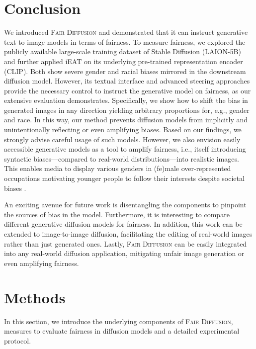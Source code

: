 \documentclass{article}%
\begin{document}
\section*{Conclusion}
We introduced \textsc{Fair Diffusion} and demonstrated that it can instruct generative text-to-image models in terms of fairness. To measure fairness, we explored the publicly available large-scale training dataset of Stable Diffusion (LAION-5B) and further applied iEAT on its underlying pre-trained representation encoder (CLIP). Both show severe gender and racial biases mirrored in the downstream diffusion model. However, its textual interface and advanced steering approaches provide the necessary control to instruct the generative model on fairness, as our extensive evaluation demonstrates. Specifically, we show how to shift the bias in generated images in any direction yielding arbitrary proportions for, e.g., gender and race. In this way, our method prevents diffusion models from implicitly and unintentionally reflecting or even amplifying biases.
Based on our findings, we strongly advise careful usage of such models. However, we also envision easily accessible generative models as a tool to amplify fairness, i.e., itself introducing syntactic biases---compared to real-world distributions---into realistic images. This enables media to display various genders in (fe)male over-represented occupations motivating younger people to follow their interests despite societal biases \cite{shaw2010identity, caswell2017to, rawan2019why}.

An exciting avenue for future work is disentangling the components to pinpoint the sources of bias in the model. Furthermore, it is interesting to compare different generative diffusion models for fairness. In addition, this work can be extended to image-to-image diffusion, facilitating the editing of real-world images rather than just generated ones.
Lastly, \textsc{Fair Diffusion} can be easily integrated into any real-world diffusion application, mitigating unfair image generation or even amplifying fairness.


\section*{Methods}
In this section, we introduce the underlying components of \textsc{Fair Diffusion}, measures to evaluate fairness in diffusion models and a detailed experimental protocol.
\end{document}
